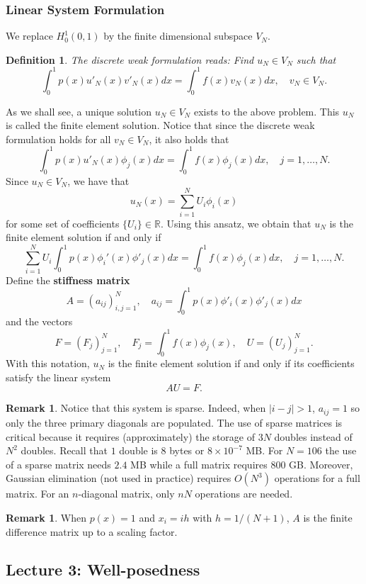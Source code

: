 \documentclass{article}
\newtheorem{definition}[theorem]{Definition}
\theoremstyle{definition}
\theoremstyle{definition}
\newtheorem{remark}[theorem]{Remark}
\newcommand{\R}{\mathbb{R}}
\begin{document}
\subsubsection{Linear System Formulation}
We replace $H^1_0(0,1)$ by the finite dimensional subspace $V_N$.
\begin{definition}
    The discrete weak formulation reads: Find $u_N\in V_N$ such that
    $$\int_{0}^{1}p(x)u'_N(x)v'_N(x)dx=\int_{0}^{1}f(x)v_N(x)dx,\quad v_N\in V_N.$$
\end{definition}
As we shall see, a unique solution $u_N\in V_N$ exists to the above problem. This $u_N$ is called the finite element solution. Notice that since the discrete weak formulation holds for all $v_N\in V_N$, it also holds that
$$\int_{0}^{1}p(x)u'_N(x)\phi_j(x)dx=\int_{0}^{1}f(x)\phi_j(x)dx,\quad j=1,\ldots,N.$$
Since $u_N\in V_N$, we have that
$$u_N(x)=\sum_{i=1}^{N}U_i\phi_i(x)$$
for some set of coefficients $\{U_i\}\in \R$. Using this ansatz, we obtain that $u_N$ is the finite element solution if and only if
$$\sum_{i=1}^{N}U_i\int_{0}^{1}p(x)\phi_i'(x)\phi'_j(x)dx=\int_{0}^{1}f(x)\phi_j(x)dx,\quad j=1,\ldots,N.$$
Define the \textbf{stiffness matrix}
$$A=(a_{ij})_{i,j=1}^{N},\quad a_{ij}=\int_{0}^{1}p(x)\phi'_i(x)\phi'_j(x)dx$$
and the vectors
$$F=(F_j)_{j=1}^{N},\quad F_j=\int_{0}^{1}f(x)\phi_j(x),\quad U=(U_j)_{j=1}^{N}.$$
With this notation, $u_N$ is the finite element solution if and only if its coefficients satisfy the linear system
$$AU=F.$$
\begin{remark}
Notice that this system is sparse. Indeed, when $|i-j|>1$, $a_{ij}=1$ so only the three primary diagonals are populated. The use of sparse matrices is critical
because it requires (approximately) the storage of $3N$ doubles instead of $N^2$
doubles. Recall that $1$ double is $8$ bytes or $8\times 10^{-7}$ MB. For $N = 106$
the use of a sparse matrix needs $2.4$ MB while a full matrix requires $800$ GB. Moreover, Gaussian elimination (not used in practice) requires $O(N^3)$ operations for a full matrix. For an $n$-diagonal matrix, only $nN$ operations are needed.
\end{remark}
\begin{remark}
    When $p(x)=1$ and $x_i=ih$ with $h=1/(N+1)$, $A$ is the finite difference matrix up to a scaling factor.
\end{remark}

\subsection{Lecture 3: Well-posedness}
\end{document}

